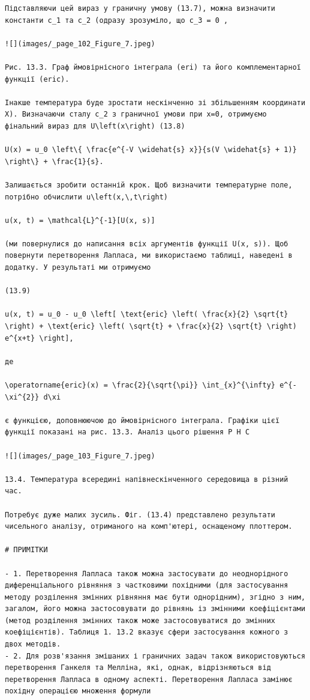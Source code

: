 \documentclass[
  ukrainian,
]{article}
\begin{document}
\begin{verbatim}
Підставляючи цей вираз у граничну умову (13.7), можна визначити константи c_1 та c_2 (одразу зрозуміло, що c_3 = 0 ,

![](images/_page_102_Figure_7.jpeg)

Рис. 13.3. Граф ймовірнісного інтеграла (eri) та його комплементарної функції (eric).

Інакше температура буде зростати нескінченно зі збільшенням координати X). Визначаючи сталу c_2 з граничної умови при x=0, отримуємо фінальний вираз для U\left(x\right) (13.8)

U(x) = u_0 \left\{ \frac{e^{-V \widehat{s} x}}{s(V \widehat{s} + 1)} \right\} + \frac{1}{s}.

Залишається зробити останній крок. Щоб визначити температурне поле, потрібно обчислити u\left(x,\,t\right) 

u(x, t) = \mathcal{L}^{-1}[U(x, s)]

(ми повернулися до написання всіх аргументів функції U(x, s)). Щоб повернути перетворення Лапласа, ми використаємо таблиці, наведені в додатку. У результаті ми отримуємо

(13.9)

u(x, t) = u_0 - u_0 \left[ \text{eric} \left( \frac{x}{2} \sqrt{t} \right) + \text{eric} \left( \sqrt{t} + \frac{x}{2} \sqrt{t} \right) e^{x+t} \right],

де

\operatorname{eric}(x) = \frac{2}{\sqrt{\pi}} \int_{x}^{\infty} e^{-\xi^{2}} d\xi

є функцією, доповнюючою до ймовірнісного інтеграла. Графіки цієї функції показані на рис. 13.3. Аналіз цього рішення P H C

![](images/_page_103_Figure_7.jpeg)

13.4. Температура всередині напівнескінченного середовища в різний час.

Потребує дуже малих зусиль. Фіг. (13.4) представлено результати чисельного аналізу, отриманого на комп'ютері, оснащеному плоттером.

# ПРИМІТКИ

- 1. Перетворення Лапласа також можна застосувати до неоднорідного диференціального рівняння з частковими похідними (для застосування методу розділення змінних рівняння має бути однорідним), згідно з ним, загалом, його можна застосовувати до рівнянь із змінними коефіцієнтами (метод розділення змінних також може застосовуватися до змінних коефіцієнтів). Таблиця 1. 13.2 вказує сфери застосування кожного з двох методів.
- 2. Для розв'язання змішаних і граничних задач також використовуються перетворення Ганкеля та Мелліна, які, однак, відрізняються від перетворення Лапласа в одному аспекті. Перетворення Лапласа замінює похідну операцією множення формули


\end{verbatim}
\end{document}
